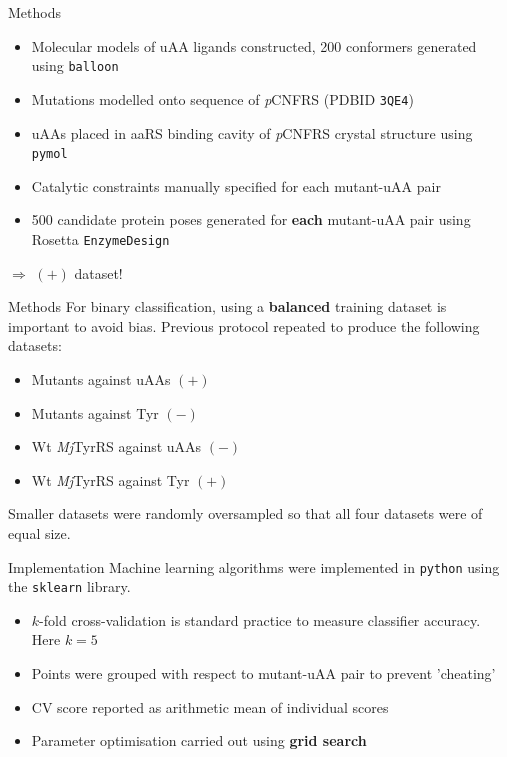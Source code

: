\documentclass{beamer}
\begin{document}
\begin{frame}{Methods}
    \begin{itemize}
        \item Molecular models of uAA ligands constructed, 200 conformers generated using \texttt{balloon}
        \item Mutations modelled onto sequence of \textit{p}CNFRS (PDBID \texttt{3QE4})
        \item uAAs placed in aaRS binding cavity of \textit{p}CNFRS crystal structure using \texttt{pymol}
        \item Catalytic constraints manually specified for each mutant-uAA pair
        \item 500 candidate protein poses generated for \textbf{each} mutant-uAA pair using Rosetta \texttt{EnzymeDesign}
    \end{itemize}
    \begin{center}$\Rightarrow$ $(+)$ dataset!\end{center}
\end{frame}

\begin{frame}{Methods}
    For binary classification, using a \textbf{balanced} training dataset is important to avoid bias. Previous protocol repeated to produce the following datasets:
    \begin{itemize}
        \item Mutants against uAAs $(+)$
        \item Mutants against Tyr $(-)$
    \end{itemize}
    \begin{itemize}
        \item Wt \textit{Mj}TyrRS against uAAs $(-)$
        \item Wt \textit{Mj}TyrRS against Tyr $(+)$
    \end{itemize}
    
    Smaller datasets were randomly oversampled so that all four datasets were of equal size.
\end{frame}

\begin{frame}{Implementation}
    Machine learning algorithms were implemented in \texttt{python} using the \texttt{sklearn} library.
    \begin{itemize}
        \item $k$-fold cross-validation is standard practice to measure classifier accuracy. Here $k = 5$
        \item Points were grouped with respect to mutant-uAA pair to prevent 'cheating'
        \item CV score reported as arithmetic mean of individual scores
        \item Parameter optimisation carried out using \textbf{grid search}
    \end{itemize}
\end{frame}
\end{document}
